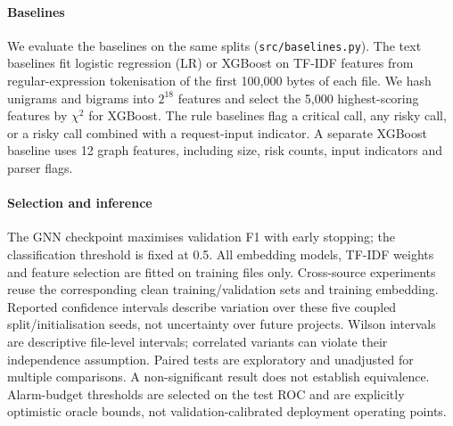 \paragraph{Baselines}
We evaluate the baselines on the same splits (\texttt{src/baselines.py}). The text baselines fit logistic
regression (LR) or XGBoost on TF-IDF features from regular-expression tokenisation of the first 100,000
bytes of each file. We hash unigrams and bigrams into $2^{18}$ features and select the 5,000 highest-scoring
features by $\chi^2$ for XGBoost. The rule baselines flag a critical call, any risky call, or a risky call
combined with a request-input indicator. A separate XGBoost baseline uses 12 graph features, including
size, risk counts, input indicators and parser flags.

\paragraph{Selection and inference}
The GNN checkpoint maximises validation F1 with early stopping; the classification threshold is fixed at 0.5.
All embedding models, TF-IDF weights and feature selection are fitted on training files only.
Cross-source experiments reuse the corresponding clean training/validation sets and training embedding.
Reported confidence intervals describe variation over these five coupled split/initialisation seeds, not
uncertainty over future projects. Wilson intervals are descriptive file-level intervals; correlated variants
can violate their independence assumption. Paired tests are exploratory and unadjusted for multiple comparisons.
A non-significant result does not establish equivalence. Alarm-budget thresholds are selected on the test ROC
and are explicitly optimistic oracle bounds, not validation-calibrated deployment operating points.
